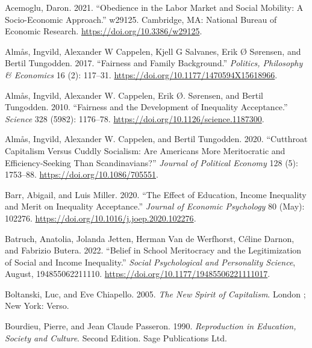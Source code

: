 \documentclass[
  letterpaper,
  DIV=11,
  numbers=noendperiod]{scrartcl}
\newlength{\cslhangindent}
\newenvironment{CSLReferences}[2] %
 {\begin{list}{}{%
  \setlength{\itemindent}{0pt}
  \setlength{\leftmargin}{0pt}
  \setlength{\parsep}{0pt}
  \ifodd #1
   \setlength{\leftmargin}{\cslhangindent}
   \setlength{\itemindent}{-1\cslhangindent}
  \fi
  \setlength{\itemsep}{#2\baselineskip}}}
 {\end{list}}
\begin{document}
\label{refs}
\begin{CSLReferences}{1}{0}
Acemoglu, Daron. 2021. {``Obedience in the {Labor Market} and {Social
Mobility}: {A Socio-Economic Approach}.''} w29125. Cambridge, MA:
National Bureau of Economic Research.
\url{https://doi.org/10.3386/w29125}.

Almås, Ingvild, Alexander W Cappelen, Kjell G Salvanes, Erik Ø Sørensen,
and Bertil Tungodden. 2017. {``Fairness and Family Background.''}
\emph{Politics, Philosophy \& Economics} 16 (2): 117--31.
\url{https://doi.org/10.1177/1470594X15618966}.

Almås, Ingvild, Alexander W. Cappelen, Erik Ø. Sørensen, and Bertil
Tungodden. 2010. {``Fairness and the {Development} of {Inequality
Acceptance}.''} \emph{Science} 328 (5982): 1176--78.
\url{https://doi.org/10.1126/science.1187300}.

Almås, Ingvild, Alexander W. Cappelen, and Bertil Tungodden. 2020.
{``Cutthroat {Capitalism} Versus {Cuddly Socialism}: {Are Americans More
Meritocratic} and {Efficiency-Seeking} Than {Scandinavians}?''}
\emph{Journal of Political Economy} 128 (5): 1753--88.
\url{https://doi.org/10.1086/705551}.

Barr, Abigail, and Luis Miller. 2020. {``The Effect of Education, Income
Inequality and Merit on Inequality Acceptance.''} \emph{Journal of
Economic Psychology} 80 (May): 102276.
\url{https://doi.org/10.1016/j.joep.2020.102276}.

Batruch, Anatolia, Jolanda Jetten, Herman Van de Werfhorst, Céline
Darnon, and Fabrizio Butera. 2022. {``Belief in {School Meritocracy} and
the {Legitimization} of {Social} and {Income Inequality}.''}
\emph{Social Psychological and Personality Science}, August,
194855062211110. \url{https://doi.org/10.1177/19485506221111017}.

Boltanski, Luc, and Eve Chiapello. 2005. \emph{The New Spirit of
Capitalism}. London ; New York: Verso.

Bourdieu, Pierre, and Jean Claude Passeron. 1990. \emph{Reproduction in
{Education}, {Society} and {Culture}}. Second Edition. Sage Publications
Ltd.


\end{CSLReferences}
\end{document}
